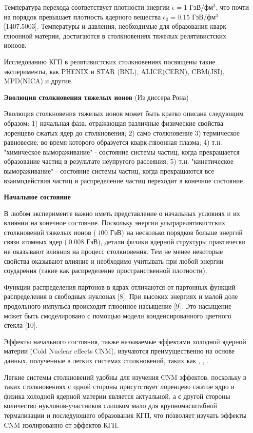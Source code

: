 Температура перехода соответствует плотности энергии $\epsilon = 1$ ГэВ/фм$^3$, что почти на порядок превышает плотность ядерного вещества $\epsilon_0 = 0.15$ ГэВ/фм$^3$[1407.5003]. Температуры и давления, необходимые для образования кварк-глюонной материи, достигаются в столкновениях тяжелых релятивистских ионоов.

Исследованию КГП в релятивистских столкновениях посвящены такие эксперименты, как PHENIX и STAR (BNL), ALICE(CERN), CBM(JSI), MPD(NICA) и другие.

\textbf{Эволюция столкновения тяжелых ионов} (Из диссера Рона)

Эволюция столкновения тяжелых ионов может быть кратко описана следующим образом: 1) начальная фаза, отражающая различные физические свойства лоренцево сжатых ядер до столкновения; 2) само столкновение 3) термическое равновесие, во время которого образуется кварк-глюонная плазма; 4) т.н. "химическое вымораживание" - состояние системы частиц, когда прекращается образование частиц в результате неупругого рассеяния; 5) т.н. "кинетическое вымораживание" - состояние системы частиц, когда прекращаются все взаимодействия частиц и распределение частиц переходит в конечное состояние.  

\textbf{Начальное состояние} 

В любом эксперименте важно иметь представление о начальных условиях и их влиянии на конечное состояние. Поскольку энергии ультрарелятивистских столкновений тяжелых ионов ($~100$ ГэВ) на несколько порядков больше энергий связи атомных ядер ($~0.008$ ГэВ), детали физики ядерной структуры практически не оказывают влияния на процесс столкновения. Тем не менее некоторые свойства оказывают влияние и необходимо учитывать при любой энергии соударения (такие как распределение пространственной плотности). 

Функции распределения партонов в ядрах отличаются от партонных функций распределения в свободных нуклонах [8]. При высоких энергиях и малой доле продольного импульса происходит глюонное  насыщение [9]. Это насыщение может быть смоделировано с помощью модели конденсированного цветного стекла [10].

Эффекты начального состояния, также называемые эффектами холодной ядерной материи (Cold Nuclear effects CNM), изучаются преимущественно на основе данных, полученные в легких системах столкновений, таких как \pal, \dau, \heau. 

Легкие системы столкновений удобны для изучения CNM эффектов, поскольку в таких столкновениях с одной стороны присутствует лоренцево сжатое ядро и физика холодной ядерной материи является актуальной, а с другой стороны количество нуклонов-участников слишком мало для крупномасштабной термализации и последующего образования КГП, что позволяет изучать эффекты CNM изолированно от эффектов КГП. 

